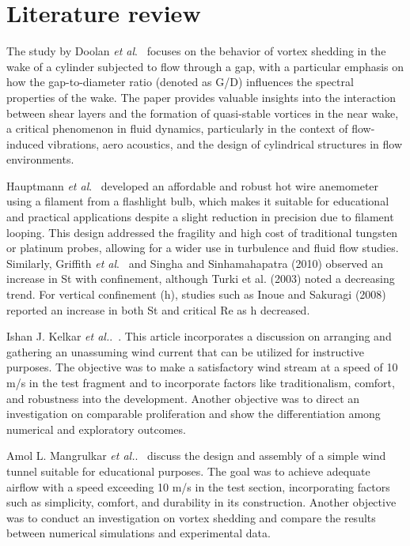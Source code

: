 \chapter{Literature review}\label{ch:Literature}


The study by Doolan \textit{et al}.~\cite{DOOLAN2012} focuses on the behavior of vortex shedding in the wake of a cylinder subjected to flow through a gap, with a particular emphasis on how the gap-to-diameter ratio (denoted as G/D) influences the spectral properties of the wake. The paper provides valuable insights into the interaction between shear layers and the formation of quasi-stable vortices in the near wake, a critical phenomenon in fluid dynamics, particularly in the context of flow-induced vibrations, aero acoustics, and the design of cylindrical structures in flow environments.

Hauptmann \textit{et al}.~\cite{UHartmann_1982} developed an affordable and robust hot wire anemometer using a filament from a flashlight bulb, which makes it suitable for educational and practical applications despite a slight reduction in precision due to filament looping. This design addressed the fragility and high cost of traditional tungsten or platinum probes, allowing for a wider use in turbulence and fluid flow studies. Similarly, Griffith \textit{et al}.~\cite{HOSSEINI2020103103} and Singha and Sinhamahapatra (2010) observed an increase in St with confinement, although Turki et al. (2003) noted a decreasing trend. For vertical confinement (h), studies such as Inoue and Sakuragi (2008) reported an increase in both St and critical Re as h decreased.

Ishan J. Kelkar \textit{ et al.}.~\cite{kelkar2019design}. This article incorporates a discussion on arranging and gathering an unassuming wind current that can be utilized for instructive purposes. The objective was to make a satisfactory wind stream at a speed of 10 m/s in the test fragment and to incorporate factors like traditionalism, comfort, and robustness into the development. Another objective was to direct an investigation on comparable proliferation and show the differentiation among numerical and exploratory outcomes.

Amol L. Mangrulkar\textit{ et al.}.~\cite{mangrulkar2019design} discuss the design and assembly of a simple wind tunnel suitable for educational purposes. The goal was to achieve adequate airflow with a speed exceeding 10 m/s in the test section, incorporating factors such as simplicity, comfort, and durability in its construction. Another objective was to conduct an investigation on vortex shedding and compare the results between numerical simulations and experimental data.

